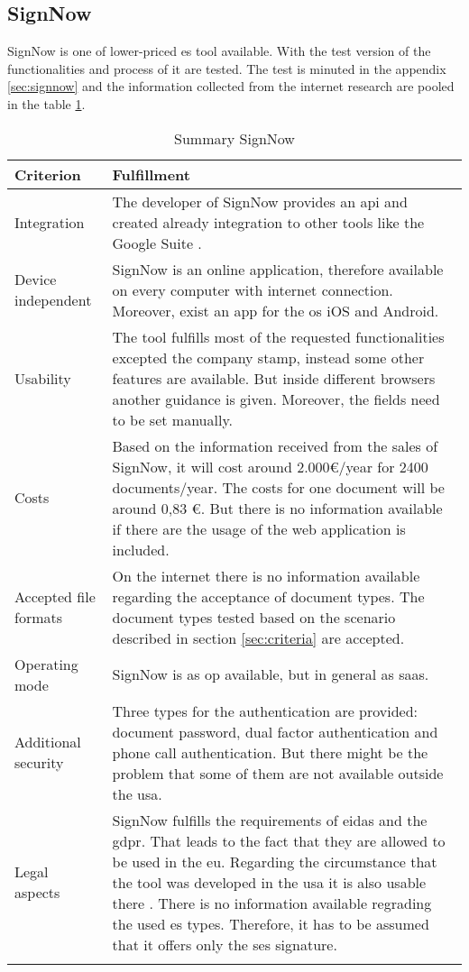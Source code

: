 \subsection{SignNow}
SignNow is one of lower-priced \gls{es} tool available. With the test version of the functionalities and process of it are tested. The test is minuted in the appendix \ref{sec:signnow} and the information collected from the internet research are pooled in the table \ref{tab:signnow}.
	\begin{longtable}{|p{4cm}|p{10cm}|} \hline
		\rowcolor{Gray}Criterion & Fulfillment \\ \hline
		Integration & The developer of SignNow provides an \gls{api} and created already integration to other tools like the Google Suite \parencite{signnow2018enterprise,signnow2018price}.\\ \hline
		Device independent & SignNow is an online application, therefore available on every computer with internet connection. Moreover, exist an \gls{app} for the \gls{os} iOS and Android.\\ \hline
		Usability & The tool fulfills most of the requested functionalities excepted the company stamp, instead some other features are available. But inside different browsers another guidance is given. Moreover, the fields need to be set manually.\\ \hline
		Costs & Based on the information received from the sales of SignNow, it will cost around 2.000\euro /year for 2400 documents/year. The costs for one document will be around 0,83 \euro. But there is no information available if there are the usage of the web application is included. \\ \hline
		Accepted file formats & On the internet there is no information available regarding the acceptance of document types. The document types tested based on the scenario described in section \ref{sec:criteria} are accepted.\\ \hline
		Operating mode & SignNow is as \gls{op} available, but in general as \gls{saas}. \parencite{signnow2018op} \\ \hline
		Additional security & Three types for the authentication are provided: document password, dual factor authentication and phone call authentication. But there might be the problem that some of them are not available outside the \gls{usa}. \parencite{signnow2018security} \\ \hline
		Legal aspects & SignNow fulfills the requirements of \gls{eidas} and the \gls{gdpr}. That leads to the fact that they are allowed to be used in the \gls{eu}. Regarding the circumstance that the tool was developed in the \gls{usa} it is also usable there \parencite{signnow2018legal}. There is no information available regrading the used \gls{es} types. Therefore, it has to be assumed that it offers only the \gls{ses} signature. \\ \hline
	\caption{Summary SignNow}
	\label{tab:signnow}
	\end{longtable}

